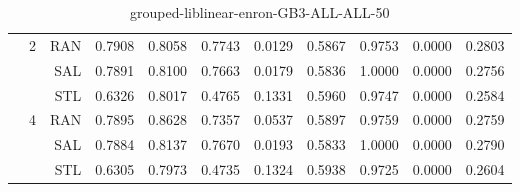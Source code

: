 \begin{center}
\begin{table}[htbp]
\begin{center}
\begin{tabular}{ | r | r | r | r | r | r | r | r | r | r | r |}
 & \multirow{3}{*}{2} & RAN & 0.7908 & 0.8058 & 0.7743 & 0.0129 & 0.5867 & 0.9753 & 0.0000 & 0.2803\\ \cline{3-11}
 &   & SAL & 0.7891 & 0.8100 & 0.7663 & 0.0179 & 0.5836 & 1.0000 & 0.0000 & 0.2756\\ \cline{3-11}
 &   & STL & 0.6326 & 0.8017 & 0.4765 & 0.1331 & 0.5960 & 0.9747 & 0.0000 & 0.2584\\ \cline{2-11}
 & \multirow{3}{*}{4} & RAN & 0.7895 & 0.8628 & 0.7357 & 0.0537 & 0.5897 & 0.9759 & 0.0000 & 0.2759\\ \cline{3-11}
 &   & SAL & 0.7884 & 0.8137 & 0.7670 & 0.0193 & 0.5833 & 1.0000 & 0.0000 & 0.2790\\ \cline{3-11}
 &   & STL & 0.6305 & 0.7973 & 0.4735 & 0.1324 & 0.5938 & 0.9725 & 0.0000 & 0.2604\\ \cline{2-11}
\hline
\end{tabular}
\caption{grouped-liblinear-enron-GB3-ALL-ALL-50}
\end{center}
 \end{table}
\end{center}

